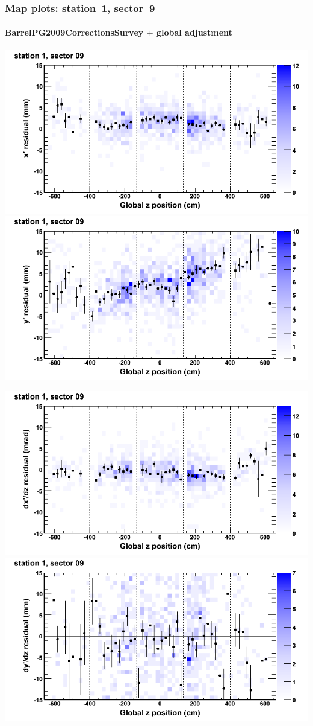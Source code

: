 \documentclass[compress]{beamer}
\begin{document}
\begin{frame}
\frametitle{Map plots: station~1, sector~9}
\framesubtitle{BarrelPG2009CorrectionsSurvey $+$ global adjustment}
\includegraphics[width=0.5\linewidth]{mapplots_re01/DTvsz_st1sec09_x.png}
\includegraphics[width=0.5\linewidth]{mapplots_re01/DTvsz_st1sec09_y.png}

\includegraphics[width=0.5\linewidth]{mapplots_re01/DTvsz_st1sec09_dxdz.png}
\includegraphics[width=0.5\linewidth]{mapplots_re01/DTvsz_st1sec09_dydz.png}
\end{frame}
\end{document}
